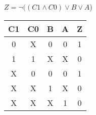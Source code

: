 
\begin{center}
    {\(Z = \lnot ((C1 \land C0) \lor B \lor A \))}
    \begin{table}[h] %
        \begin{center}
            \begin{tabular}{|c|c|c|c||c|} \hline
            C1 & C0 & B & A & Z \\ \hline\hline
            0  & X  & 0 & 0 & 1 \\ \hline
            1  & 1  & X & X & 0 \\ \hline
            X  & 0  & 0 & 0 & 1 \\ \hline
            X  & X  & 1 & X & 0 \\ \hline
            X  & X  & X & 1 & 0 \\ \hline
            \end{tabular}
        \end{center}
    \end{table}
\end{center}
